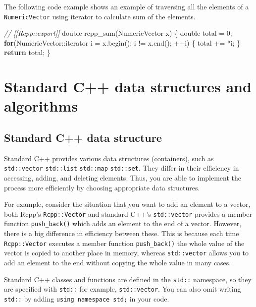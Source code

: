 \documentclass[]{book}
\newenvironment{Shaded}{\begin{snugshade}}{\end{snugshade}}
\newcommand{\CommentTok}[1]{\textcolor[rgb]{0.56,0.35,0.01}{\textit{#1}}}
\newcommand{\ControlFlowTok}[1]{\textcolor[rgb]{0.13,0.29,0.53}{\textbf{#1}}}
\newcommand{\DataTypeTok}[1]{\textcolor[rgb]{0.13,0.29,0.53}{#1}}
\newcommand{\DecValTok}[1]{\textcolor[rgb]{0.00,0.00,0.81}{#1}}
\newcommand{\NormalTok}[1]{#1}
\begin{document}
The following code example shows an example of traversing all the elements of a \texttt{NumericVector} using iterator to calculate sum of the elements.

\begin{Shaded}
\begin{Highlighting}[]
\CommentTok{// [[Rcpp::export]]}
\DataTypeTok{double}\NormalTok{ rcpp_sum(NumericVector x) \{}
  \DataTypeTok{double}\NormalTok{ total = }\DecValTok{0}\NormalTok{;}
  \ControlFlowTok{for}\NormalTok{(NumericVector::iterator i = x.begin(); i != x.end(); ++i) \{}
\NormalTok{    total += *i;}
\NormalTok{  \}}
  \ControlFlowTok{return}\NormalTok{ total;}
\NormalTok{\}}
\end{Highlighting}
\end{Shaded}

\hypertarget{standard-c-data-structures-and-algorithms}{%
\chapter{Standard C++ data structures and algorithms}\label{standard-c-data-structures-and-algorithms}}

\hypertarget{standard-c-data-structure}{%
\section{Standard C++ data structure}\label{standard-c-data-structure}}

Standard C++ provides various data structures (containers), such as \texttt{std::vector} \texttt{std::list} \texttt{std::map} \texttt{std::set}. They differ in their efficiency in accessing, adding, and deleting elements. Thus, you are able to implement the process more efficiently by choosing appropriate data structures.

For example, consider the situation that you want to add an element to a vector, both Rcpp's \texttt{Rcpp::Vector} and standard C++'s \texttt{std::vector} provides a member function \texttt{push\_back()} which adds an element to the end of a vector. However, there is a big difference in efficiency between these. This is because each time \texttt{Rcpp::Vector} executes a member function \texttt{push\_back()} the whole value of the vector is copied to another place in memory, whereas \texttt{std::vector} allows you to add an element to the end without copying the whole value in many cases.

Standard C++ classes and functions are defined in the \texttt{std::} namespace, so they are specified with \texttt{std::} for example, \texttt{std::vector}. You can also omit writing \texttt{std::} by adding \texttt{using\ namespace\ std;} in your code.
\end{document}
